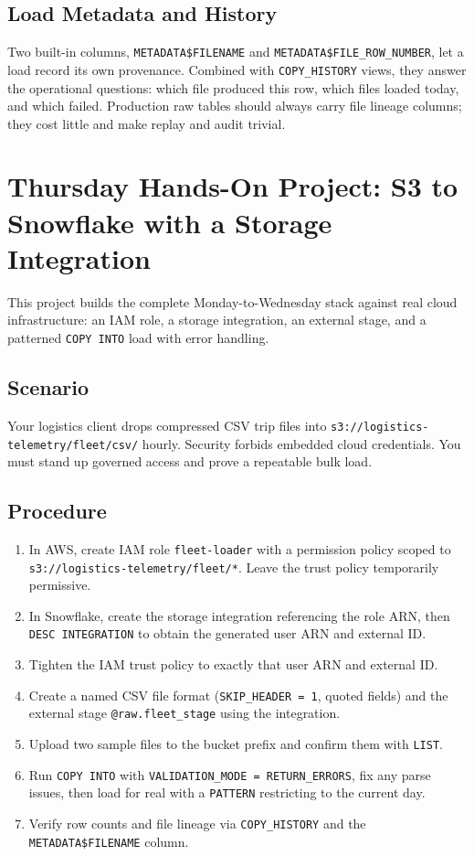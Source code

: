 \subsection{Load Metadata and History}
Two built-in columns, \texttt{METADATA\$FILENAME} and \texttt{METADATA\$FILE\_ROW\_NUMBER}, let a load record its own provenance. Combined with \texttt{COPY\_HISTORY} views, they answer the operational questions: which file produced this row, which files loaded today, and which failed. Production raw tables should always carry file lineage columns; they cost little and make replay and audit trivial.

\section{Thursday Hands-On Project: S3 to Snowflake with a Storage Integration}
This project builds the complete Monday-to-Wednesday stack against real cloud infrastructure: an IAM role, a storage integration, an external stage, and a patterned \texttt{COPY INTO} load with error handling.

\subsection*{Scenario}
Your logistics client drops compressed CSV trip files into \texttt{s3://logistics-telemetry/fleet/csv/} hourly. Security forbids embedded cloud credentials. You must stand up governed access and prove a repeatable bulk load.

\subsection*{Procedure}
\begin{enumerate}
    \item In AWS, create IAM role \texttt{fleet-loader} with a permission policy scoped to \texttt{s3://logistics-telemetry/fleet/*}. Leave the trust policy temporarily permissive.
    \item In Snowflake, create the storage integration referencing the role ARN, then \texttt{DESC INTEGRATION} to obtain the generated user ARN and external ID.
    \item Tighten the IAM trust policy to exactly that user ARN and external ID.
    \item Create a named CSV file format (\texttt{SKIP\_HEADER = 1}, quoted fields) and the external stage \texttt{@raw.fleet\_stage} using the integration.
    \item Upload two sample files to the bucket prefix and confirm them with \texttt{LIST}.
    \item Run \texttt{COPY INTO} with \texttt{VALIDATION\_MODE = RETURN\_ERRORS}, fix any parse issues, then load for real with a \texttt{PATTERN} restricting to the current day.
    \item Verify row counts and file lineage via \texttt{COPY\_HISTORY} and the \texttt{METADATA\$FILENAME} column.
\end{enumerate}

